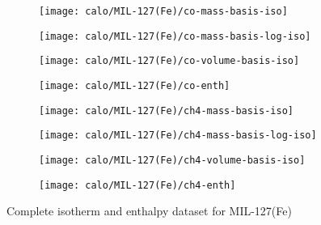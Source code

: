 \begin{figure}[H]
    \begin{subfigure}{0.25\textwidth}
        \texttt{[image: calo/MIL-127(Fe)/co-mass-basis-iso]}%
        \label{appx:fgr:shaping:mil127comass}
    \end{subfigure}%
    \begin{subfigure}{0.25\textwidth}
        \texttt{[image: calo/MIL-127(Fe)/co-mass-basis-log-iso]}%
        \label{appx:fgr:shaping:mil127comasslog}
    \end{subfigure}%
    \begin{subfigure}{0.25\textwidth}
        \texttt{[image: calo/MIL-127(Fe)/co-volume-basis-iso]}%
        \label{appx:fgr:shaping:mil127covolume}
    \end{subfigure}%
    \begin{subfigure}{0.25\textwidth}
        \texttt{[image: calo/MIL-127(Fe)/co-enth]}%
        \label{appx:fgr:shaping:mil127coenth}
    \end{subfigure}%

    \begin{subfigure}{0.25\textwidth}
        \texttt{[image: calo/MIL-127(Fe)/ch4-mass-basis-iso]}%
        \label{appx:fgr:shaping:mil127ch4mass}
    \end{subfigure}%
    \begin{subfigure}{0.25\textwidth}
        \texttt{[image: calo/MIL-127(Fe)/ch4-mass-basis-log-iso]}%
        \label{appx:fgr:shaping:mil127ch4masslog}
    \end{subfigure}%
    \begin{subfigure}{0.25\textwidth}
        \texttt{[image: calo/MIL-127(Fe)/ch4-volume-basis-iso]}%
        \label{appx:fgr:shaping:mil127ch4volume}
    \end{subfigure}%
    \begin{subfigure}{0.25\textwidth}
        \texttt{[image: calo/MIL-127(Fe)/ch4-enth]}%
        \label{appx:fgr:shaping:mil127ch4enth}
    \end{subfigure}%

    \caption{Complete isotherm and enthalpy dataset for MIL-127(Fe)}
    
\end{figure}


